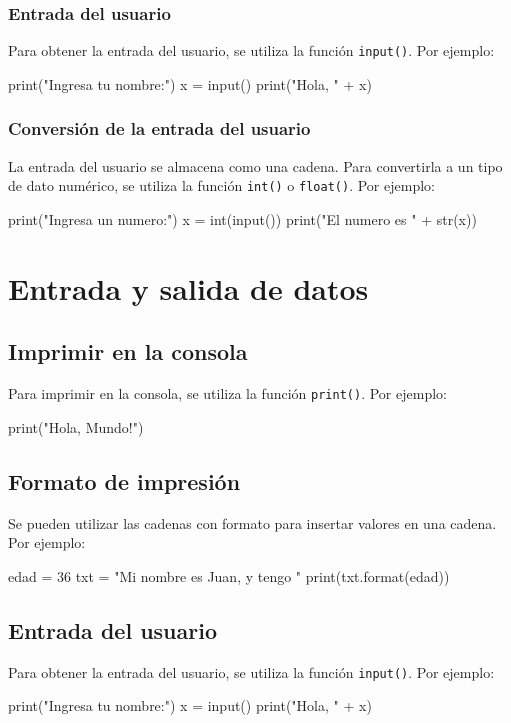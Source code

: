 \documentclass{article}
\begin{document}
\subsubsection{Entrada del usuario}
Para obtener la entrada del usuario, se utiliza la función \texttt{input()}. Por ejemplo:
\begin{python_code}
print("Ingresa tu nombre:")
x = input()
print("Hola, " + x)
\end{python_code}
\subsubsection{Conversión de la entrada del usuario}
La entrada del usuario se almacena como una cadena. Para convertirla a un tipo de dato numérico, se utiliza la función \texttt{int()} o \texttt{float()}. Por ejemplo:
\begin{python_code}
print("Ingresa un numero:")
x = int(input())
print("El numero es " + str(x))
\end{python_code}

\section{Entrada y salida de datos}
\subsection{Imprimir en la consola}
Para imprimir en la consola, se utiliza la función \texttt{print()}. Por ejemplo:
\begin{python_code}
print("Hola, Mundo!")
\end{python_code}
\subsection{Formato de impresión}
Se pueden utilizar las cadenas con formato para insertar valores en una cadena. Por ejemplo:
\begin{python_code}
edad = 36
txt = "Mi nombre es Juan, y tengo {}"
print(txt.format(edad))
\end{python_code}
\subsection{Entrada del usuario}
Para obtener la entrada del usuario, se utiliza la función \texttt{input()}. Por ejemplo:
\begin{python_code}
print("Ingresa tu nombre:")
x = input()
print("Hola, " + x)
\end{python_code}
\end{document}
